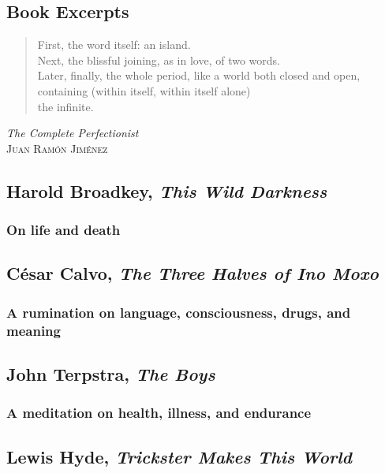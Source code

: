 \documentclass[letterpaper,oneside]{memoir}
\begin{document}
\begin{description}
\chapter{Book Excerpts}
\begin{verse}
First, the word itself: an island.\\
Next, the blissful joining, as in love, of two words.\\
Later, finally, the whole period, like a world both closed and open,\\
containing (within itself, within itself alone)\\
the infinite.
\end{verse}
{\textit{The Complete Perfectionist}\\
\textsc{Juan Ram\'on Jim\'enez}}\\
\newpage
\vspace*{5cm}
\section{Harold Broadkey, \textit{This Wild Darkness}}
\subsection{On life and death}
\newpage
\addtocounter{page}{+5}
\vspace*{5cm}
\section{C\'esar Calvo, \textit{The Three Halves of Ino Moxo}}
\subsection{A rumination on language, consciousness, drugs, and meaning}
\newpage
\addtocounter{page}{+6}
\vspace*{5cm}
\section{John Terpstra, \textit{The Boys}}
\subsection{A meditation on health, illness, and endurance}
\newpage
\addtocounter{page}{+13}
\vspace*{5cm}
\section{Lewis Hyde, \textit{Trickster Makes This World}}

\end{description}
\end{document}
